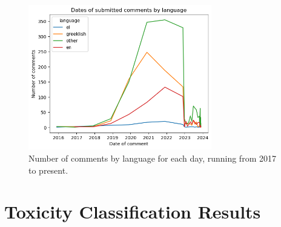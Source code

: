 \documentclass[11pt, a4paper]{article}
\begin{document}
	\begin{figure}[h!]
		\includegraphics[width=8cm]{time_plot.png}
		\centering
		\caption{Number of comments by language for each day, running from 2017 to present.}
		\label{fig::timeseries.png}
	\end{figure}
	
	
	
	\section{Toxicity Classification Results}
	
	
\end{document}
